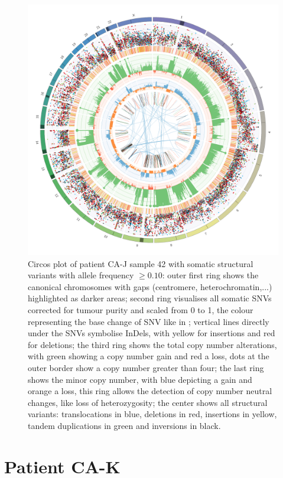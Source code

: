 \begin{figure}[ht]
\centering
\includegraphics[width=.99\linewidth]{Figures/CASCADE/CA80/CA80-42.circos.png}
\caption[Circos plot of patient CA-J sample 42]{Circos plot of patient CA-J sample 42 with somatic structural variants with allele frequency $\geq 0.10$: outer first ring shows the canonical chromosomes with gaps (centromere, heterochromatin,...) highlighted as darker areas; second ring visualises all somatic SNVs corrected for tumour purity and scaled from 0 to 1, the colour representing the base change of SNV like in \protect\textcite{Alexandrov2013}; vertical lines directly under the SNVs symbolise InDels, with yellow for insertions and red for deletions; the third ring shows the total copy number alterations, with green showing a copy number gain and red a loss, dots at the outer border show a copy number greater than four; the last ring shows the minor copy number, with blue depicting a gain and orange a loss, this ring allows the detection of copy number neutral changes, like loss of heterozygosity; the center shows all structural variants: translocations in blue, deletions in red, insertions in yellow, tandem duplications in green and inversions in black.} \label{fig:ca80.42circos}
\end{figure}

\cleardoublepage
\section{Patient CA-K}

